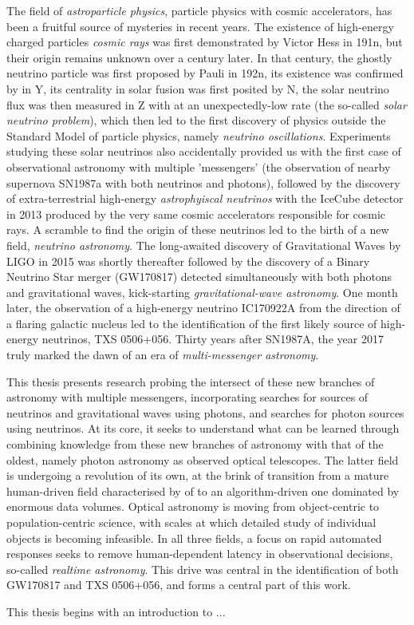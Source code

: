 The field of \emph{astroparticle physics}, particle physics with cosmic accelerators, has been a fruitful source of mysteries in recent years. The existence of high-energy charged particles \emph{cosmic rays} was first demonstrated by Victor Hess in 191n, but their origin remains unknown over a century later. In that century, the ghostly neutrino particle was first proposed by Pauli in 192n, its existence was confirmed by in Y, its centrality in solar fusion was first posited by N, the solar neutrino flux was then measured in Z with at an unexpectedly-low rate (the so-called \emph{solar neutrino problem}), which then led to the first discovery of physics outside the Standard Model of particle physics, namely \emph{neutrino oscillations}. Experiments studying these solar neutrinos also accidentally provided us with the first case of observational astronomy with multiple 'messengers' (the observation of nearby supernova SN1987a with both neutrinos and photons), followed by the discovery of extra-terrestrial high-energy \emph{astrophyiscal neutrinos} with the IceCube detector in 2013 produced by the very same cosmic accelerators responsible for cosmic rays. A scramble to find the origin of these neutrinos led to the birth of a new field, \emph{neutrino astronomy}. The long-awaited discovery of Gravitational Waves by LIGO in 2015 was shortly thereafter followed by the discovery of a Binary Neutrino Star merger (GW170817) detected simultaneously with both photons and gravitational waves, kick-starting \emph{gravitational-wave astronomy}. One month later, the observation of a high-energy neutrino IC170922A from the direction of a flaring galactic nucleus led to the identification of the first likely source of high-energy neutrinos, TXS 0506+056. Thirty years after SN1987A, the year 2017 truly marked the dawn of an era of \emph{multi-messenger astronomy}. 

This thesis presents research probing the intersect of these new branches of astronomy with multiple messengers, incorporating searches for sources of neutrinos and gravitational waves using photons, and searches for photon sources using neutrinos. At its core, it seeks to understand what can be learned through combining knowledge from these new branches of astronomy with that of the oldest, namely photon astronomy as observed optical telescopes. The latter field is undergoing a revolution of its own, at the brink of transition from a mature human-driven field characterised by  of to an algorithm-driven one dominated by enormous data volumes. Optical astronomy is moving from object-centric to population-centric science, with scales at which detailed study of individual objects is becoming infeasible. In all three fields, a focus on rapid automated responses seeks to remove human-dependent latency in observational decisions, so-called \emph{realtime astronomy}. This drive was central in the identification of both GW170817 and TXS 0506+056, and forms a central part of this work.

This thesis begins with an introduction to ...



